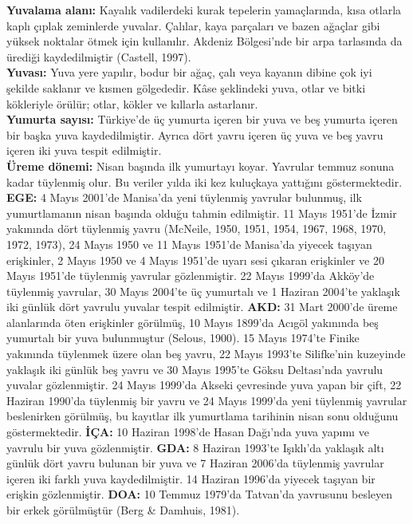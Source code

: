 \documentclass[
  10.5pt,
  a4paper,
  DIV=11,
  numbers=noendperiod,
  twocolumn]{scrreprt}
\begin{document}
\textbf{Yuvalama alanı:} Kayalık vadilerdeki kurak tepelerin
yamaçlarında, kısa otlarla kaplı çıplak zeminlerde yuvalar. Çalılar,
kaya parçaları ve bazen ağaçlar gibi yüksek noktalar ötmek için
kullanılır. Akdeniz Bölgesi'nde bir arpa tarlasında da ürediği
kaydedilmiştir (Castell, 1997).\\
\textbf{Yuvası:} Yuva yere yapılır, bodur bir ağaç, çalı veya kayanın
dibine çok iyi şekilde saklanır ve kısmen gölgededir. Kâse şeklindeki
yuva, otlar ve bitki kökleriyle örülür; otlar, kökler ve kıllarla
astarlanır.\\
\textbf{Yumurta sayısı:} Türkiye'de üç yumurta içeren bir yuva ve beş
yumurta içeren bir başka yuva kaydedilmiştir. Ayrıca dört yavru içeren
üç yuva ve beş yavru içeren iki yuva tespit edilmiştir.\\
\textbf{Üreme dönemi:} Nisan başında ilk yumurtayı koyar. Yavrular
temmuz sonuna kadar tüylenmiş olur. Bu veriler yılda iki kez kuluçkaya
yattığını göstermektedir. \textbf{EGE:} 4 Mayıs 2001'de Manisa'da yeni
tüylenmiş yavrular bulunmuş, ilk yumurtlamanın nisan başında olduğu
tahmin edilmiştir. 11 Mayıs 1951'de İzmir yakınında dört tüylenmiş yavru
(McNeile, 1950, 1951, 1954, 1967, 1968, 1970, 1972, 1973), 24 Mayıs 1950
ve 11 Mayıs 1951'de Manisa'da yiyecek taşıyan erişkinler, 2 Mayıs 1950
ve 4 Mayıs 1951'de uyarı sesi çıkaran erişkinler ve 20 Mayıs 1951'de
tüylenmiş yavrular gözlenmiştir. 22 Mayıs 1999'da Akköy'de tüylenmiş
yavrular, 30 Mayıs 2004'te üç yumurtalı ve 1 Haziran 2004'te yaklaşık
iki günlük dört yavrulu yuvalar tespit edilmiştir. \textbf{AKD:} 31 Mart
2000'de üreme alanlarında öten erişkinler görülmüş, 10 Mayıs 1899'da
Acıgöl yakınında beş yumurtalı bir yuva bulunmuştur (Selous, 1900). 15
Mayıs 1974'te Finike yakınında tüylenmek üzere olan beş yavru, 22 Mayıs
1993'te Silifke'nin kuzeyinde yaklaşık iki günlük beş yavru ve 30 Mayıs
1995'te Göksu Deltası'nda yavrulu yuvalar gözlenmiştir. 24 Mayıs 1999'da
Akseki çevresinde yuva yapan bir çift, 22 Haziran 1990'da tüylenmiş bir
yavru ve 24 Mayıs 1999'da yeni tüylenmiş yavrular beslenirken görülmüş,
bu kayıtlar ilk yumurtlama tarihinin nisan sonu olduğunu göstermektedir.
\textbf{İÇA:} 10 Haziran 1998'de Hasan Dağı'nda yuva yapımı ve yavrulu
bir yuva gözlenmiştir. \textbf{GDA:} 8 Haziran 1993'te Işıklı'da
yaklaşık altı günlük dört yavru bulunan bir yuva ve 7 Haziran 2006'da
tüylenmiş yavrular içeren iki farklı yuva kaydedilmiştir. 14 Haziran
1996'da yiyecek taşıyan bir erişkin gözlenmiştir. \textbf{DOA:} 10
Temmuz 1979'da Tatvan'da yavrusunu besleyen bir erkek görülmüştür (Berg
\& Damhuis, 1981).
\end{document}
